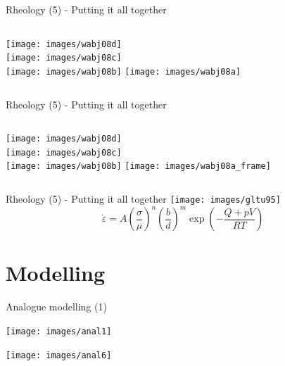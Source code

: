 \documentclass[handout]{beamer}
\begin{document}
\begin{frame}[plain]{Rheology (5) - Putting it all together}
\begin{columns}[onlytextwidth]
\texttt{[image: images/wabj08d]}\\
\texttt{[image: images/wabj08c]}\\
\texttt{[image: images/wabj08b]}
\pause
\texttt{[image: images/wabj08a]}
\end{columns}
\end{frame}

\begin{frame}[plain]{Rheology (5) - Putting it all together}
\begin{columns}[onlytextwidth]
\texttt{[image: images/wabj08d]}\\
\texttt{[image: images/wabj08c]}\\
\texttt{[image: images/wabj08b]}
\texttt{[image: images/wabj08a\_frame]}
\end{columns}
\end{frame}




\begin{frame}[plain]{Rheology (5) - Putting it all together}
\texttt{[image: images/gltu95]}
\pause
\[
\dot\varepsilon = A \left(\frac{\sigma}{\mu}\right)^n \left(\frac{b}{d}\right)^m \exp\left( -\frac{Q+pV}{RT} \right)
\]
\end{frame}



\section{Modelling}

\begin{frame}[plain]{Analogue modelling (1)}

\texttt{[image: images/anal1]}

\texttt{[image: images/anal6]}





\end{frame}
\end{document}
